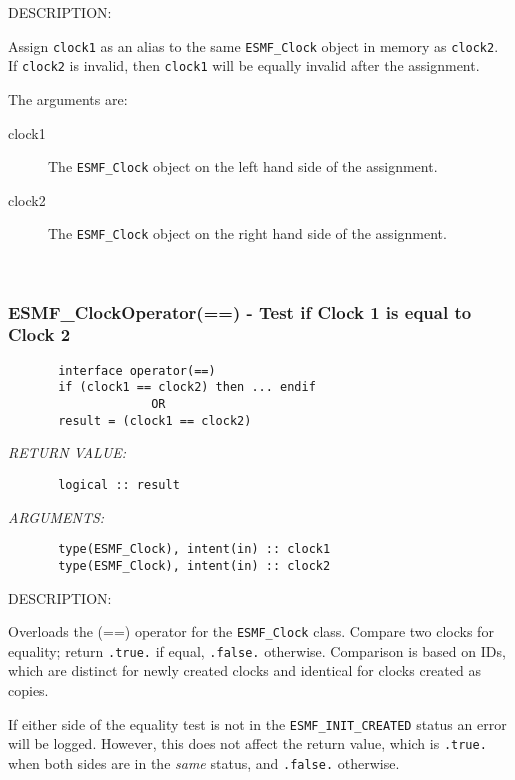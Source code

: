 {\sf DESCRIPTION:\\ }


       Assign {\tt clock1} as an alias to the same {\tt ESMF\_Clock} object in
       memory as {\tt clock2}. If {\tt clock2} is invalid, then {\tt clock1}
       will be equally invalid after the assignment.
  
       The arguments are:
       \begin{description}
       \item[clock1]
            The {\tt ESMF\_Clock} object on the left hand side of the
            assignment.
       \item[clock2]
            The {\tt ESMF\_Clock} object on the right hand side of the
            assignment.
       \end{description}
   
 
\mbox{}\hrulefill\ 
 
\subsubsection [ESMF\_ClockOperator(==)] {ESMF\_ClockOperator(==) - Test if Clock 1 is equal to Clock 2}


  
\begin{verbatim}       interface operator(==)
       if (clock1 == clock2) then ... endif
                    OR
       result = (clock1 == clock2)\end{verbatim}{\em RETURN VALUE:}
\begin{verbatim}       logical :: result\end{verbatim}{\em ARGUMENTS:}
\begin{verbatim}       type(ESMF_Clock), intent(in) :: clock1
       type(ESMF_Clock), intent(in) :: clock2\end{verbatim}
{\sf DESCRIPTION:\\ }


       Overloads the (==) operator for the {\tt ESMF\_Clock} class.
       Compare two clocks for equality; return {\tt .true.} if equal,
       {\tt .false.} otherwise. Comparison is based on IDs, which are distinct
       for newly created clocks and identical for clocks created as copies.
  
       If either side of the equality test is not in the
       {\tt ESMF\_INIT\_CREATED} status an error will be logged. However, this
       does not affect the return value, which is {\tt .true.} when both
       sides are in the {\em same} status, and {\tt .false.} otherwise.
  
